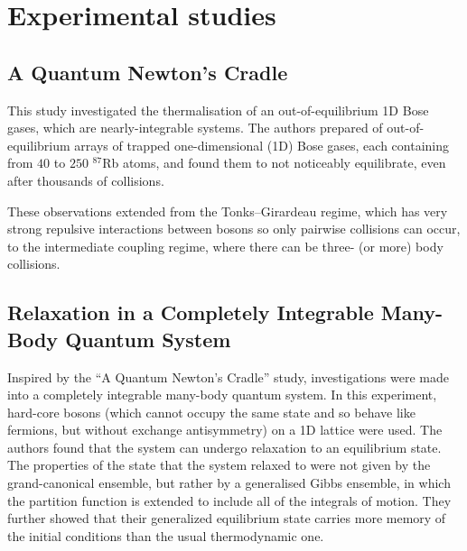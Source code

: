 \documentclass[a4paper,10pt]{article}
\begin{document}
\section{Experimental studies}
\subsection{A Quantum Newton's Cradle\cite{Kinoshita2006}}

This study investigated the thermalisation of an out-of-equilibrium 1D Bose gases, which are nearly-integrable systems. The authors prepared
of out-of-equilibrium arrays of trapped one-dimensional (1D) Bose gases, each containing from $40$ to $250$ $^{87}$Rb atoms, and found them to not noticeably equilibrate,
even after thousands of collisions. 

These observations extended from the Tonks–Girardeau regime, which has very strong repulsive interactions between bosons so only pairwise collisions can occur, to the intermediate 
coupling regime, where there can be three- (or more) body collisions. 

\subsection{Relaxation in a Completely Integrable Many-Body Quantum System \cite{Rigol2007}}

Inspired by the ``A Quantum Newton's Cradle'' study, investigations were made into a completely integrable many-body quantum system. In this experiment, hard-core bosons (which cannot
occupy the same state and so behave like fermions, but without exchange antisymmetry) on a 1D lattice were used. The authors found that the system can undergo relaxation to an equilibrium 
state. The properties of the state that the system relaxed to were not given by the grand-canonical ensemble, but rather by a generalised Gibbs ensemble, in which the partition function 
is extended to include all of the integrals of motion. They further showed that their generalized equilibrium state carries more memory of the initial conditions than the usual thermodynamic one.
\end{document}
